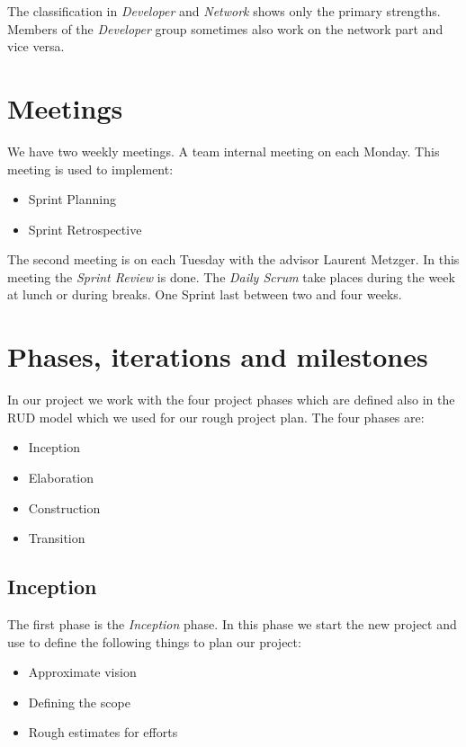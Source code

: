 \noindent The classification in \textsl{Developer} and \textsl{Network} shows only the primary strengths.
Members of the \textsl{Developer} group sometimes also work on the network part and vice versa.


\section{Meetings}
\label{meetings}
We have two weekly meetings.
A team internal meeting on each Monday.
This meeting is used to implement:
\begin{itemize}
  \item Sprint Planning
  \item Sprint Retrospective 
\end{itemize}

\noindent The second meeting is on each Tuesday with the advisor Laurent Metzger.
In this meeting the \textsl{Sprint Review} is done.
The \textsl{Daily Scrum} take places during the week at lunch or during breaks.
One Sprint last between two and four weeks.


\section{Phases, iterations and milestones}
\label{phases}
In our project we work with the four project phases which are defined also in the RUD model which we used for our rough project plan. The four phases are:
\begin{itemize}
    \item Inception
    \item Elaboration
    \item Construction
    \item Transition
\end{itemize}

\subsection{Inception}
The first phase is the \textit{Inception} phase. In this phase we start the new project and use to define the following things to plan our project:
\begin{itemize}
    \item Approximate vision
    \item Defining the scope
    \item Rough estimates for efforts
\end{itemize}

